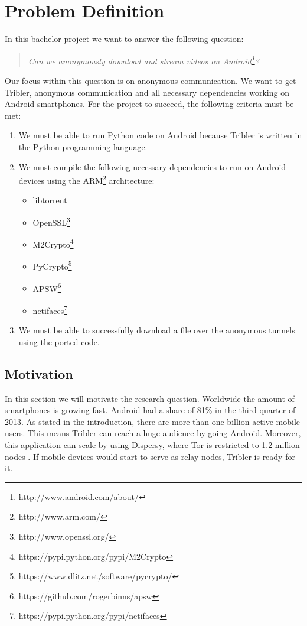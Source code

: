 \chapter{Problem Definition}
\label{cpt:problemdefinition}

In this bachelor project we want to answer the following question:

\begin{quote}
\emph{Can we anonymously download and stream videos on Android\footnote{http://www.android.com/about/}?}
\end{quote}

Our focus within this question is on anonymous communication. We want to get Tribler, anonymous communication and all necessary dependencies working on Android smartphones. For the project to succeed, the following criteria must be met:
\begin{enumerate}
\item We must be able to run Python code on Android because Tribler is written in the Python programming language.
\item We must compile the following necessary dependencies to run on Android devices using the ARM\footnote{http://www.arm.com/} architecture:
\begin{itemize}
\item libtorrent
\item OpenSSL\footnote{http://www.openssl.org/}
\item M2Crypto\footnote{https://pypi.python.org/pypi/M2Crypto}
\item PyCrypto\footnote{https://www.dlitz.net/software/pycrypto/}
\item APSW\footnote{https://github.com/rogerbinns/apsw}
\item netifaces\footnote{https://pypi.python.org/pypi/netifaces}
\end{itemize}
\item We must be able to successfully download a file over the anonymous tunnels using the ported code.
\end{enumerate}

\section{Motivation}
	\label{sec:motivation}
		In this section we will motivate the research question. Worldwide the amount of smartphones is growing fast. Android had a share of 81\% in the third quarter of 2013\cite{forbesandroidmarket}. As stated in the introduction, there are more than one billion active mobile users. This means Tribler can reach a huge audience by going Android. Moreover, this application can scale by using Dispersy, where Tor is restricted to 1.2 million nodes \cite{mclachlan2009scalable}. If mobile devices would start to serve as relay nodes, Tribler is ready for it.
		